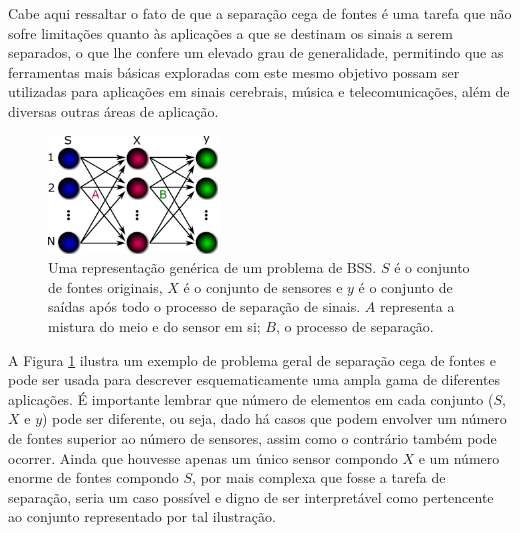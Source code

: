 
Cabe aqui ressaltar o fato de que a separação cega de fontes é uma tarefa que não sofre limitações quanto às aplicações a que se destinam os sinais a serem separados, o que lhe confere um elevado grau de generalidade, permitindo que as ferramentas mais básicas exploradas com este mesmo objetivo possam ser utilizadas para aplicações em sinais cerebrais, música e telecomunicações, além de diversas outras áreas de aplicação.

\begin{figure}[H]
    \centering
    \includegraphics[width=0.40\textwidth]{figs/BSS.pdf}
    \caption{Uma representação genérica de um problema de BSS. $S$ é o conjunto de fontes originais, $X$ é o conjunto de sensores e $y$ é o conjunto de saídas após todo o processo de separação de sinais. $A$ representa a mistura do meio e do sensor em si; $B$, o processo de separação.}
    \label{fig:bss}
\end{figure}

A Figura \ref{fig:bss} ilustra um exemplo de problema geral de separação cega de fontes e pode ser usada para descrever esquematicamente uma ampla gama de diferentes aplicações. É importante lembrar que número de elementos em cada conjunto ($S$, $X$ e $y$) pode ser diferente, ou seja, dado há casos que podem envolver um número de fontes superior ao número de sensores, assim como o contrário também pode ocorrer. Ainda que houvesse apenas um único sensor compondo $X$ e um número enorme de fontes compondo $S$, por mais complexa que fosse a tarefa de separação, seria um caso possível e digno de ser interpretável como pertencente ao conjunto representado por tal ilustração.


